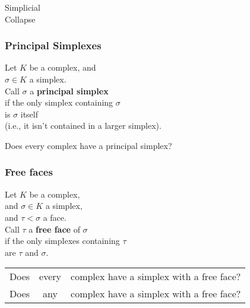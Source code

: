 \documentclass[14pt]{beamer}
\newcommand{\setbackgroundpicture}[1]{%
\usebackgroundtemplate{
\begin{pgfpicture}{0in}{0in}{\paperwidth}{\paperheight}
\pgfputat{\pgfxy(0,0)}{\texttt{[image: \#1]}}
\color{white}
\pgfsetfillopacity{0.8}
\pgfrect[fill]{\pgfxy(0,0)}{\pgfpoint{\paperwidth}{\paperheight}}
\end{pgfpicture}
}
}
\newcommand{\clearbackgroundpicture}{\usebackgroundtemplate{}}
\begin{document}

% 


\setbackgroundpicture{collapsedbarn.jpg}
\begin{frame}
  \vfill
  \begin{center}
    \Huge Simplicial \\
    Collapse
  \end{center}
  \vfill
\end{frame}
\clearbackgroundpicture

\begin{frame}
  \frametitle{Principal Simplexes}

  \begin{definition}
  Let $K$ be a complex, and \\
  $\sigma \in K$ a simplex.  \\
  Call $\sigma$ a \textbf{principal simplex} \\
  if the only simplex containing $\sigma$ \\
  is $\sigma$ itself \\
  \quad (i.e., it isn't contained in a larger simplex).
  \end{definition} 

  \pause
  \begin{problem}
  Does every complex have a principal simplex?
  \end{problem}

\end{frame}

\begin{frame}
  \frametitle{Free faces}

  \begin{definition}
  Let $K$ be a complex, \\
  and $\sigma \in K$ a simplex, \\
  and $\tau < \sigma$ a face. \\
  \vspace{1ex}Call $\tau$ a \textbf{free face} of $\sigma$ \\
  if the only simplexes containing $\tau$ \\
  are $\tau$ and $\sigma$.
  \end{definition}

  \pause
  \begin{problem}
    \begin{tabular}{@{}l@{ }c@{ }l}
      Does & every & complex have a simplex with a free face? \\\pause
      Does & any & complex have a simplex with a free face? \\
   \end{tabular}
 \end{problem}

\end{frame}
\end{document}
